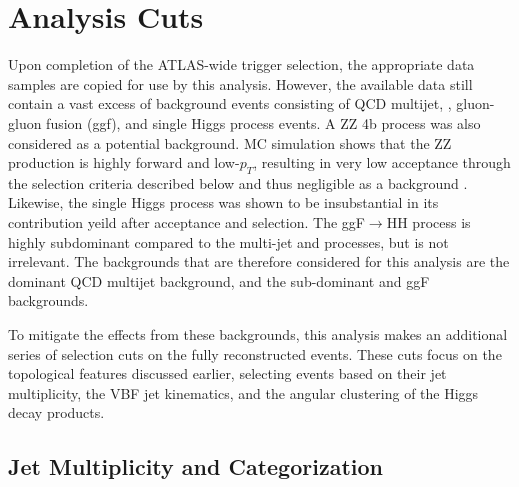 

\section{Analysis Cuts} \label{sec:analysis_cuts}

        Upon completion of the ATLAS-wide trigger selection,
            the appropriate data samples are copied for use by this analysis.
        However, the available data still contain a vast excess of background events
            consisting of QCD multijet, \ttbar, gluon-gluon fusion (ggf), and single Higgs process events.
        A ZZ \to 4b process was also considered as a potential background.
        MC simulation shows that the ZZ production is highly forward and low-$p_T$,
            resulting in very low acceptance through the selection criteria described below
            and thus negligible as a background \cite{vbf_hh_4b_resonant_2020_int}.
        Likewise, the single Higgs process was shown to be insubstantial in its contribution yeild after acceptance and selection\cite{hh4b_2021_int_note}.
        The ggF$\to$HH process is highly subdominant compared to the multi-jet and \ttbar processes,
            but is not irrelevant.
        The backgrounds that are therefore considered for this analysis are the
            dominant QCD multijet background, and the sub-dominant \ttbar and ggF backgrounds.

        To mitigate the effects from these backgrounds,
            this analysis makes an additional series of selection cuts on the fully reconstructed events.
        These cuts focus on the topological features discussed earlier,
            selecting events based on their jet multiplicity,
            the VBF jet kinematics,
            and the angular clustering of the Higgs decay products.

    \subsection{Jet Multiplicity and Categorization}
        
